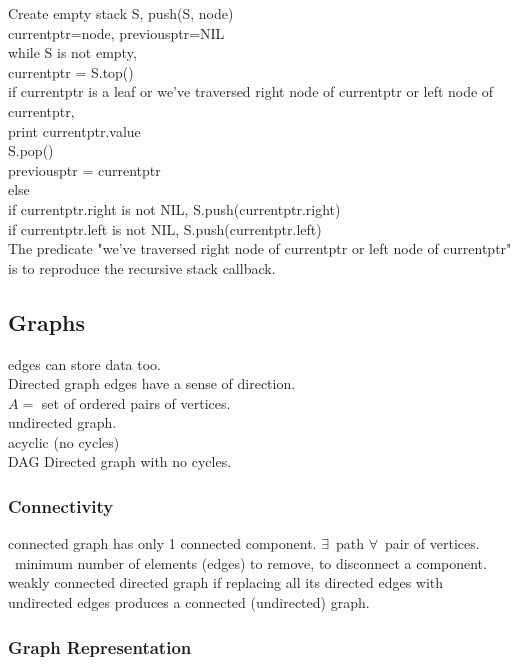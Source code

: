 \documentclass[10pt]{amsart}
\begin{document}
\begin{multicols*}{2}
Create empty stack S, push(S, node) \\
currentptr=node, previousptr=NIL \\
while S is not empty, \\
\quad currentptr = S.top() \\
\quad if currentptr is a leaf or we've traversed right node of currentptr or left node of currentptr, \\
\quad \quad print currentptr.value \\
\quad \quad S.pop() \\
\quad \quad previousptr = currentptr \\
\quad else \\
\quad \quad if currentptr.right is not NIL, S.push(currentptr.right) \\
\quad \quad if currentptr.left is not NIL, S.push(currentptr.left) \\

The predicate "we've traversed right node of currentptr or left node of currentptr" is to reproduce the recursive stack callback.


\subsection{Graphs}

edges can store data too. \\
Directed graph edges have a sense of direction. \\
$A =$ set of ordered pairs of vertices. \\
undirected graph. \\
acyclic (no cycles) \\
DAG Directed graph with no cycles.

\subsubsection{Connectivity} 

connected graph has only 1 connected component. $\exists \, $ path $\forall \, $ pair of vertices. \\
\qquad \, minimum number of elements (edges) to remove, to disconnect a component. \\

weakly connected directed graph if replacing all its directed edges with undirected edges produces a connected (undirected) graph. 

\subsubsection{Graph Representation} 


\end{multicols*}
\end{document}
